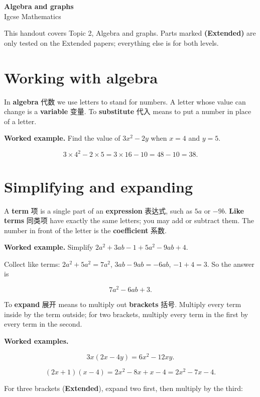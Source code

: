 \documentclass[11pt]{article}
\begin{document}
\begin{center}
  {\LARGE\bfseries Algebra and graphs}\\[0.35em]
  {\large Igcse Mathematics}
\end{center}
\vspace{0.6em}

This handout covers Topic 2, Algebra and graphs. Parts marked \textbf{(Extended)} are only tested on the Extended papers; everything else is for both levels.

\section*{Working with algebra}

In \textbf{algebra} 代数 we use letters to stand for numbers. A letter whose value can change is a \textbf{variable} 变量. To \textbf{substitute} 代入 means to put a number in place of a letter.

\textbf{Worked example.} Find the value of $3x^{2} - 2y$ when $x = 4$ and $y = 5$.

\[
3 \times 4^{2} - 2 \times 5 = 3 \times 16 - 10 = 48 - 10 = 38.
\]

\section*{Simplifying and expanding}

A \textbf{term} 项 is a single part of an \textbf{expression} 表达式, such as $5a$ or $-9b$. \textbf{Like terms} 同类项 have exactly the same letters; you may add or subtract them. The number in front of the letter is the \textbf{coefficient} 系数.

\textbf{Worked example.} Simplify $2a^{2} + 3ab - 1 + 5a^{2} - 9ab + 4$.

Collect like terms: $2a^{2} + 5a^{2} = 7a^{2}$, $3ab - 9ab = -6ab$, $-1 + 4 = 3$. So the answer is

\[
7a^{2} - 6ab + 3.
\]

To \textbf{expand} 展开 means to multiply out \textbf{brackets} 括号. Multiply every term inside by the term outside; for two brackets, multiply every term in the first by every term in the second.

\textbf{Worked examples.}

\[
3x(2x - 4y) = 6x^{2} - 12xy.
\]

\[
(2x + 1)(x - 4) = 2x^{2} - 8x + x - 4 = 2x^{2} - 7x - 4.
\]

For three brackets (\textbf{Extended}), expand two first, then multiply by the third:
\end{document}
